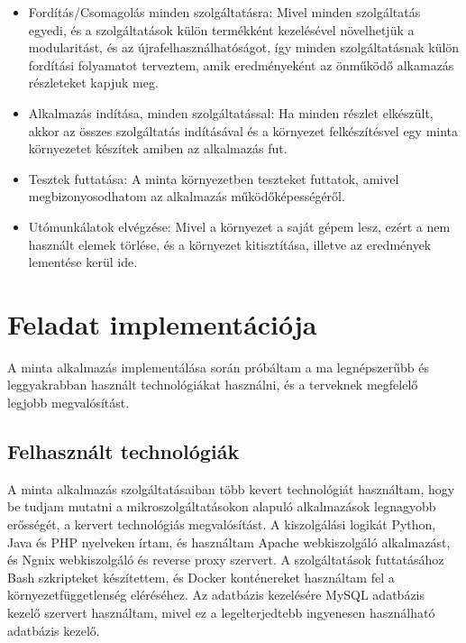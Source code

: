 \documentclass[11pt,magyar,a4paper,twoside,]{report}
\providecommand{\tightlist}{%
  \setlength{\itemsep}{0pt}\setlength{\parskip}{0pt}}
\begin{document}
\begin{itemize}
\tightlist
\item
  Fordítás/Csomagolás minden szolgáltatásra: Mivel minden szolgáltatás
  egyedi, és a szolgáltatások külön termékként kezelésével növelhetjük a
  modularitást, és az újrafelhasználhatóságot, így minden
  szolgáltatásnak külön fordítási folyamatot terveztem, amik
  eredményeként az önműködő alkamazás részleteket kapjuk meg.
\item
  Alkalmazás indítása, minden szolgáltatással: Ha minden részlet
  elkészült, akkor az összes szolgáltatás indításával és a környezet
  felkészítésvel egy minta környezetet készítek amiben az alkalmazás
  fut.
\item
  Tesztek futtatása: A minta környezetben teszteket futtatok, amivel
  megbizonyosodhatom az alkalmazás működőképességéről.
\item
  Utómunkálatok elvégzése: Mivel a környezet a saját gépem lesz, ezért a
  nem használt elemek törlése, és a környezet kitisztítása, illetve az
  eredmények lementése kerül ide.
\end{itemize}

\chapter{Feladat implementációja}\label{feladat-implementuxe1ciuxf3ja}

A minta alkalmazás implementálása során próbáltam a ma legnépszerűbb és
leggyakrabban használt technológiákat használni, és a terveknek
megfelelő legjobb megvalósítást.

\section{Felhasznált
technológiák}\label{felhasznuxe1lt-technoluxf3giuxe1k}

A minta alkalmazás szolgáltatásaiban több kevert technológiát
használtam, hogy be tudjam mutatni a mikroszolgáltatásokon alapuló
alkalmazások legnagyobb erősségét, a kervert technológiás megvalósítást.
A kiszolgálási logikát Python, Java és PHP nyelveken írtam, és
használtam Apache webkiszolgáló alkalmazást, és Ngnix webkiszolgáló és
reverse proxy szervert. A szolgáltatások futtatásához Bash szkripteket
készítettem, és Docker konténereket használtam fel a
környezetfüggetlenség eléréséhez. Az adatbázis kezelésére MySQL
adatbázis kezelő szervert használtam, mivel ez a legelterjedtebb
ingyenesen használható adatbázis kezelő.
\end{document}
